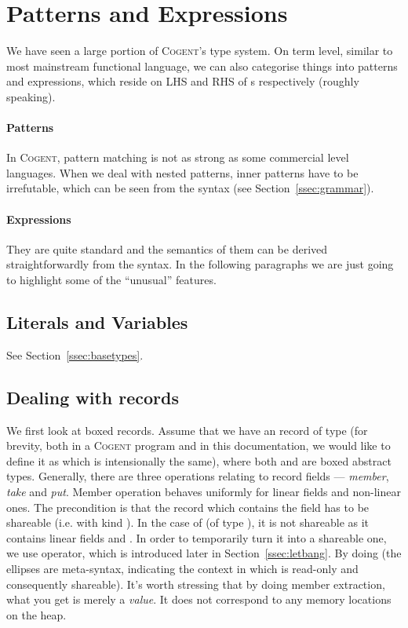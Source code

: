 \documentclass[a4paper]{article}
\newcommand{\cogent}{\textsc{Cogent}\xspace}
\begin{document}
\section{Patterns and Expressions}
We have seen a large portion of \cogent's type system. On term level, similar to most mainstream functional language,
we can also categorise things into patterns and expressions, which reside on LHS and RHS of \code{=}s respectively (roughly speaking).

\paragraph{Patterns} In \cogent, pattern matching is not as strong as some commercial level languages. When we deal with nested patterns,
inner patterns have to be irrefutable, which can be seen from the syntax (see Section~\ref{ssec:grammar}).

\paragraph{Expressions} They are quite standard and the semantics of them can be derived straightforwardly from the syntax. In the following
paragraphs we are just going to highlight some of the ``unusual'' features.

\subsection{Literals and Variables}
See Section~\ref{ssec:basetypes}.

\subsection{Dealing with records} \label{ssec:records}
We first look at boxed records. Assume that we have an record  of type  (for
brevity, both in a \cogent program and in this documentation, we would like to define it as  which is intensionally the same),
where both  and  are boxed abstract types. Generally, there are three operations relating to record fields --- \emph{member}, \emph{take} and \emph{put}.
Member operation behaves uniformly for linear fields and non-linear ones. The precondition is that the record which contains the field
has to be shareable (i.e. with kind ). In the case of  (of type ), it is not shareable as it contains linear fields  and .
In order to temporarily turn it into a shareable one, we use \code{!} operator, which is introduced later in Section~\ref{ssec:letbang}.
By doing  (the ellipses are meta-syntax, indicating the context in which  is read-only and consequently shareable).
It's worth stressing that by doing member extraction, what you get is merely a \emph{value}. It does not correspond to any memory locations on the heap.
\end{document}
